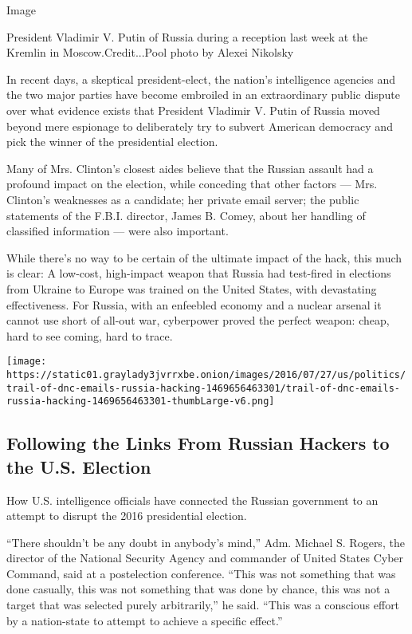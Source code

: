 Image

President Vladimir V. Putin of Russia during a reception last week at
the Kremlin in Moscow.Credit...Pool photo by Alexei Nikolsky

In recent days, a skeptical president-elect, the nation's intelligence
agencies and the two major parties have become embroiled in an
extraordinary public dispute over what evidence exists that President
Vladimir V. Putin of Russia moved beyond mere espionage to deliberately
try to subvert American democracy and pick the winner of the
presidential election.

Many of Mrs. Clinton's closest aides believe that the Russian assault
had a profound impact on the election, while conceding that other
factors --- Mrs. Clinton's weaknesses as a candidate; her private email
server; the public statements of the F.B.I. director, James B. Comey,
about her handling of classified information --- were also important.

While there's no way to be certain of the ultimate impact of the hack,
this much is clear: A low-cost, high-impact weapon that Russia had
test-fired in elections from Ukraine to Europe was trained on the United
States, with devastating effectiveness. For Russia, with an enfeebled
economy and a nuclear arsenal it cannot use short of all-out war,
cyberpower proved the perfect weapon: cheap, hard to see coming, hard to
trace.

\href{https://www.nytimes3xbfgragh.onion/interactive/2016/07/27/us/politics/trail-of-dnc-emails-russia-hacking.html}{}

\texttt{[image: https://static01.graylady3jvrrxbe.onion/images/2016/07/27/us/politics/trail-of-dnc-emails-russia-hacking-1469656463301/trail-of-dnc-emails-russia-hacking-1469656463301-thumbLarge-v6.png]}

\hypertarget{following-the-links-from-russian-hackers-to-the-us-election}{%
\subsection{Following the Links From Russian Hackers to the U.S.
Election}\label{following-the-links-from-russian-hackers-to-the-us-election}}

How U.S. intelligence officials have connected the Russian government to
an attempt to disrupt the 2016 presidential election.

``There shouldn't be any doubt in anybody's mind,'' Adm. Michael S.
Rogers, the director of the National Security Agency and commander of
United States Cyber Command, said at a postelection conference. ``This
was not something that was done casually, this was not something that
was done by chance, this was not a target that was selected purely
arbitrarily,'' he said. ``This was a conscious effort by a nation-state
to attempt to achieve a specific effect.''

